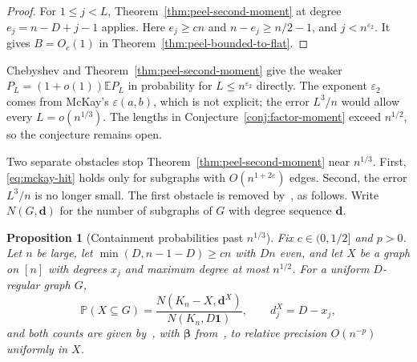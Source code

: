 \documentclass[11pt]{article}
\newtheorem{proposition}[theorem]{Proposition}
\newcommand{\EE}{\mathbb{E}}
\newcommand{\PP}{\mathbb{P}}
\begin{document}
\begin{proof}
For \(1\le j<L\), Theorem~\ref{thm:peel-second-moment} at degree
\(e_j=n-D+j-1\) applies. Here \(e_j\ge cn\) and \(n-e_j\ge n/2-1\), and
\(j<n^{\varepsilon_2}\).
It gives \(B=O_c(1)\) in Theorem~\ref{thm:peel-bounded-to-flat}.
\end{proof}

Chebyshev and Theorem~\ref{thm:peel-second-moment} give the weaker
\(P_L=(1+o(1))\EE P_L\) in probability for \(L\le n^{\varepsilon_2}\) directly.
The exponent \(\varepsilon_2\) comes from McKay's \(\varepsilon(a,b)\), which is not
explicit; the error \(L^3/n\) would allow every \(L=o(n^{1/3})\).
The lengths in Conjecture~\ref{conj:factor-moment} exceed \(n^{1/2}\), so
the conjecture remains open.

Two separate obstacles stop Theorem~\ref{thm:peel-second-moment} near
\(n^{1/3}\).
First, \eqref{eq:mckay-hit} holds only for subgraphs with
\(O(n^{1+2\varepsilon})\) edges.
Second, the error \(L^3/n\) is no longer small.
The first obstacle is removed by~\cite{IM25}, as follows.
Write \(N(G,\boldsymbol d)\) for the number of subgraphs of \(G\) with degree
sequence \(\boldsymbol d\).

\begin{proposition}[Containment probabilities past \(n^{1/3}\)]
\label{prop:im-containment}
Fix \(c\in(0,1/2]\) and \(p>0\).
Let \(n\) be large, let \(\min(D,n-1-D)\ge cn\) with \(Dn\) even, and let \(X\) be
a graph on \([n]\) with degrees \(x_j\) and maximum degree at most \(n^{1/2}\).
For a uniform \(D\)-regular graph \(G\),
\[
\PP(X\subseteq G)=\frac{N(K_n-X,\boldsymbol d^X)}{N(K_n,D\mathbf 1)},
\qquad d^X_j=D-x_j,
\]
and both counts are given by~\cite[Theorem~1.2]{IM25}, with \(\boldsymbol\beta\)
from~\cite[Theorem~1.3]{IM25}, to relative precision \(O(n^{-p})\) uniformly
in \(X\).
\end{proposition}
\end{document}
